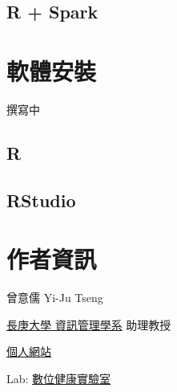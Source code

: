\documentclass[]{book}
\theoremstyle{definition}
\theoremstyle{definition}
\theoremstyle{remark}
\begin{document}
\section{R + Spark}\label{r-spark}

\chapter{軟體安裝}\label{install}

撰寫中

\section{R}\label{r-1}

\section{RStudio}\label{rstudio}

\chapter*{作者資訊}\label{author}

曾意儒 Yi-Ju Tseng

\href{http://im.cgu.edu.tw/bin/home.php}{長庚大學 資訊管理學系} 助理教授

\href{http://yijutseng.github.io}{個人網站}

Lab: \href{http://yijutseng.github.io/Lab/}{數位健康實驗室}


\end{document}
